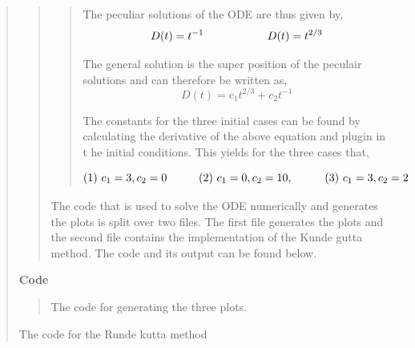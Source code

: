 \begin{quote}
\begin{quote}
\begin{quote}
The peculiar solutions of the ODE are thus given by,
\begin{equation}
D(t) = t^{-1} \hspace*{2cm} D(t) = t^{2/3}
\end{equation}

The general solution is the super position of the peculair solutions  and can therefore be written as,
\begin{equation}
D(t) = c_{1} t^{2/3} + c_2 t^{-1}
\end{equation}

The constants for the three initial cases can be found by calculating the derivative of the above equation and plugin in t he initial conditions. This yields for the three cases that, %

\begin{equation}
\text{(1) } c_1 = 3, c_2 = 0 \hspace*{1cm} \text{(2) } c_1 =0, c_2 = 10, \hspace*{1cm} \text{(3) } c_1 = 3, c_2 = 2 
\end{equation}

\end{quote}

The code that is used to solve the ODE numerically and generates the plots is split over two files. The first file generates the plots and the second file contains the implementation of the Kunde gutta method. The code and its output can be found below. %
\end{quote}

\textbf{Code}

\begin{quote}
The code for generating the three plots.
\centering

\end{quote}

The code for the Runde kutta method
\centering

\newpage


\end{quote}
